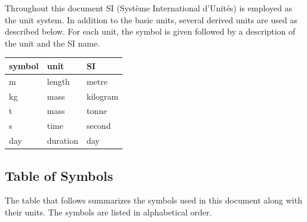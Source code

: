 \documentclass[12pt]{article}
\begin{document}
Throughout this document SI (Syst\`{e}me International d'Unit\'{e}s) is employed
as the unit system.  In addition to the basic units, several derived units are
used as described below.  For each unit, the symbol is given followed by a
description of the unit and the SI name.
~\newline

\renewcommand{\arraystretch}{1.2}
  \noindent \begin{tabular}{l l l} 
    \toprule		
    \textbf{symbol} & \textbf{unit} & \textbf{SI}\\
    \midrule 

    \si{\metre} & length & metre \\
    \si{\kilogram} & mass & kilogram \\
    \si{t} & mass & tonne\\
    \si{\second} & time & second \\
    \si{day} & duration & day \\

    \bottomrule
  \end{tabular}

\subsection{Table of Symbols}

The table that follows summarizes the symbols used in this document along with
their units. The symbols are listed in alphabetical order.

\break
\break
\end{document}
